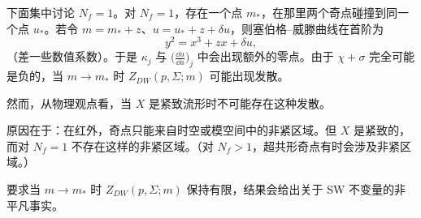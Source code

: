 下面集中讨论 $N_{f}=1$。对 $N_{f}=1$，存在一个点 $m_{*}$，在那里两个奇点碰撞到同一个点 $u_{*}$。若令 $m=m_{*}+z$、$u=u_{*}+z+\delta u$，则塞伯格--威滕曲线在首阶为
\begin{equation}
  y^{2}=x^{3}+zx+\delta u,
  \tag{11.4}
\end{equation}
（差一些数值系数）。于是 $\kappa_{j}$ 与 $\bigl(\frac{\dd u}{\dd a}\bigr)_{j}$ 中会出现额外的零点。由于 $\chi+\sigma$ 完全可能是负的，当 $m\to m_{*}$ 时 $Z_{DW}(p,\Sigma;m)$ 可能出现发散。

然而，从物理观点看，当 $X$ 是紧致流形时不可能存在这种发散。

原因在于：在红外，奇点只能来自时空或模空间中的非紧区域。但 $X$ 是紧致的，而对 $N_{f}=1$ 不存在这样的非紧区域。（对 $N_{f}>1$，超共形奇点有时会涉及非紧区域。）

要求当 $m\to m_{*}$ 时 $Z_{DW}(p,\Sigma;m)$ 保持有限，结果会给出关于 SW 不变量的非平凡事实。





